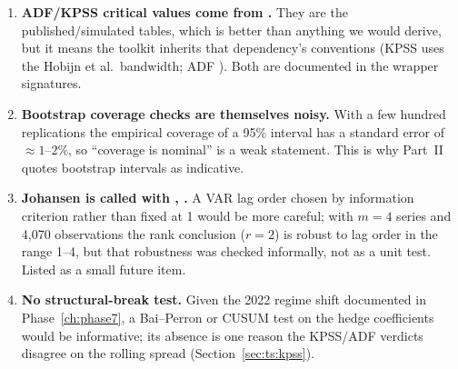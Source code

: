 \begin{enumerate}
  \item \textbf{ADF/KPSS critical values come from .} They are the
    published/simulated tables, which is better than anything we would derive, but it means
    the toolkit inherits that dependency's conventions (KPSS  uses the
    Hobijn et al.\ bandwidth; ADF ). Both are documented in the wrapper
    signatures.
  \item \textbf{Bootstrap coverage checks are themselves noisy.} With a few hundred
    replications the empirical coverage of a 95\% interval has a standard error of
    $\approx1$--$2\%$, so ``coverage is nominal'' is a weak statement. This is why
    Part~II quotes bootstrap intervals as indicative.
  \item \textbf{Johansen is called with , .} A VAR
    lag order chosen by information criterion rather than fixed at 1 would be more careful;
    with $m=4$ series and 4{,}070 observations the rank conclusion ($r=2$) is robust to lag
    order in the range 1--4, but that robustness was checked informally, not as a unit test.
    Listed as a small future item.
  \item \textbf{No structural-break test.} Given the 2022 regime shift documented in
    Phase~\ref{ch:phase7}, a Bai--Perron or CUSUM test on the hedge coefficients would be
    informative; its absence is one reason the KPSS/ADF verdicts disagree on the rolling
    spread (Section~\ref{sec:ts:kpss}).
\end{enumerate}
